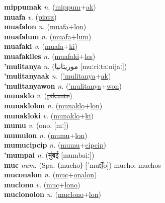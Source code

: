 \textbf{mippumak} \textit{n.} (\hyperref[mippum]{mippum}+\hyperref[ak]{ak})
 \label{mippumak} \\
\textbf{muafa} \textit{v.} (\hyperref[piasa]{\sout{piasa}})
 \label{muafa} \\
\textbf{muafalon} \textit{n.} (\hyperref[muafa]{muafa}+\hyperref[lon]{lon})
 \label{muafalon} \\
\textbf{muafalum} \textit{n.} (\hyperref[muafa]{muafa}+\hyperref[lum]{lum})
 \label{muafalum} \\
\textbf{muafaki} \textit{v.} (\hyperref[muafa]{muafa}+\hyperref[ki]{ki})
 \label{muafaki} \\
\textbf{muafakiles} \textit{n.} (\hyperref[muafaki]{muafaki}+\hyperref[les]{les})
 \label{muafakiles} \\
\textbf{'mulitanya} \textit{n.} ({\arabics{}موريتانيا‎} [muːriːtaːnijaː])
 \label{'mulitanya} \\
\textbf{'mulitanyaak} \textit{n.} (\hyperref['mulitanya]{'mulitanya}+\hyperref[ak]{ak})
 \label{'mulitanyaak} \\
\textbf{'mulitanyawon} \textit{n.} (\hyperref['mulitanya]{'mulitanya}+\hyperref[won]{won})
 \label{'mulitanyawon} \\
\textbf{munaklo} \textit{v.} (\hyperref[pikante]{\sout{pikante}})
 \label{munaklo} \\
\textbf{munaklolon} \textit{n.} (\hyperref[munaklo]{munaklo}+\hyperref[lon]{lon})
 \label{munaklolon} \\
\textbf{munakloki} \textit{v.} (\hyperref[munaklo]{munaklo}+\hyperref[ki]{ki})
 \label{munakloki} \\
\textbf{mumu} \textit{v.} (ono. [mː])
 \label{mumu} \\
\textbf{mumulon} \textit{n.} (\hyperref[mumu]{mumu}+\hyperref[lon]{lon})
 \label{mumulon} \\
\textbf{mumucipcip} \textit{n.} (\hyperref[mumu]{mumu}+\hyperref[cipcip]{cipcip})
 \label{mumucipcip} \\
\textbf{'mumpai} \textit{n.} ({\devanagari{}मुंबई} [mumbaiː])
 \label{'mumpai} \\
\textbf{muc} \textit{num.} (Spa. ⟨mucho⟩ [ˈmut͡ʃo])
mucho; muchos \label{muc} \\
\textbf{muconalon} \textit{n.} (\hyperref[muc]{muc}+\hyperref[onalon]{onalon})
 \label{muconalon} \\
\textbf{muclono} \textit{v.} (\hyperref[muc]{muc}+\hyperref[lono]{lono})
 \label{muclono} \\
\textbf{muclonolon} \textit{n.} (\hyperref[muclono]{muclono}+\hyperref[lon]{lon})
